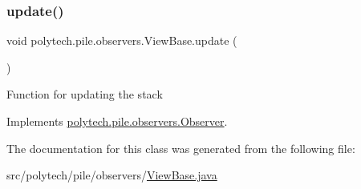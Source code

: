 \subsubsection{\texorpdfstring{update()}{update()}}
{\footnotesize\ttfamily void polytech.\+pile.\+observers.\+View\+Base.\+update (\begin{DoxyParamCaption}{ }\end{DoxyParamCaption})}

Function for updating the stack 

Implements \hyperlink{interfacepolytech_1_1pile_1_1observers_1_1_observer_afeb6abcefc917edee5d1f33bfb76e6b1}{polytech.\+pile.\+observers.\+Observer}.



The documentation for this class was generated from the following file\+:\begin{DoxyCompactItemize}
\item 
src/polytech/pile/observers/\hyperlink{_view_base_8java}{View\+Base.\+java}\end{DoxyCompactItemize}
